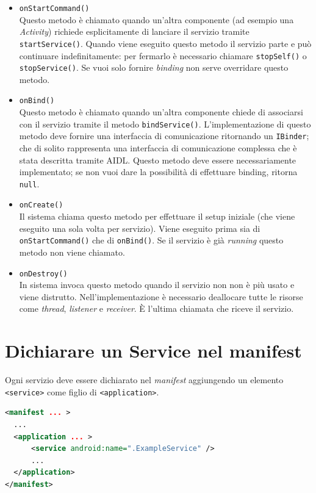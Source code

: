 \documentclass{book}
\begin{document}
\begin{itemize}
	\item \texttt{onStartCommand()}\\
	Questo metodo è chiamato quando un'altra componente (ad esempio una \textit{Activity}) richiede esplicitamente di lanciare il servizio tramite \texttt{startService()}. Quando viene eseguito questo metodo il servizio parte e può continuare indefinitamente: per fermarlo è necessario chiamare \texttt{stopSelf()} o \texttt{stopService()}. Se vuoi solo fornire \textit{binding} non serve overridare questo metodo.
	\item \texttt{onBind()}\\
	Questo metodo è chiamato quando un'altra componente chiede di associarsi con il servizio tramite il metodo \texttt{bindService()}. L'implementazione di questo metodo deve fornire una interfaccia di comunicazione ritornando un \texttt{IBinder}; che di solito rappresenta una interfaccia di comunicazione complessa che è stata descritta tramite AIDL. Questo metodo deve essere necessariamente implementato; se non vuoi dare la possibilità di effettuare binding, ritorna \texttt{null}.
	\item \texttt{onCreate()}\\
	Il sistema chiama questo metodo per effettuare il setup iniziale (che viene eseguito una sola volta per servizio). Viene eseguito prima sia di \texttt{onStartCommand()} che di \texttt{onBind()}. Se il servizio è già \textit{running} questo metodo non viene chiamato.
	\item \texttt{onDestroy()}\\
	In sistema invoca questo metodo quando il servizio non non è più usato e viene distrutto. Nell'implementazione è necessario deallocare tutte le risorse come \textit{thread}, \textit{listener} e \textit{receiver}. È l'ultima chiamata che riceve il servizio.
\end{itemize}

\section{Dichiarare un Service nel manifest}
Ogni servizio deve essere dichiarato nel \textit{manifest} aggiungendo un elemento \texttt{<service>} come figlio di \texttt{<application>}.
\begin{lstlisting}[language=XML]
<manifest ... >
  ...
  <application ... >
      <service android:name=".ExampleService" />
      ...
  </application>
</manifest>
\end{lstlisting}
\end{document}
